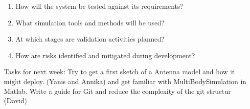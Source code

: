 	\begin{enumerate}
		\item How will the system be tested against its requirements?
		\item What simulation tools and methods will be used?
		\item At which stages are validation activities planned?
		\item How are risks identified and mitigated during development?
	\end{enumerate}
	Tasks for next week: Try to get a first sketch of a Antenna model and how it might deploy. (Yanis and Annika) and get familiar with MultiBodySimulation in Matlab.
	Write a guide for Git and reduce the complexity of the git structur (David)

